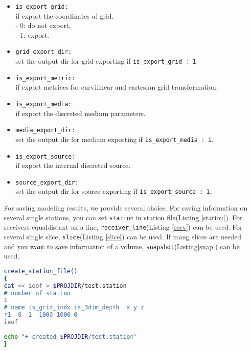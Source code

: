 \begin{itemize}
	\item \verb|is_export_grid:| \\
	if export the coordinates of grid.\\
	- 0: do not export, \\
	- 1: export.
	\item \verb|grid_export_dir:| \\
	set the output dir for grid exporting if \verb|is_export_grid : 1|.
	\item \verb|is_export_metric:| \\
	if export metrices for curvilinear and cartesian grid transformation.
	\item \verb|is_export_media:| \\
	if export the  discreted medium parameters. 
	\item \verb|media_export_dir:| \\
	set the output dir for medium exporting if \verb|is_export_media : 1|.
	\item \verb|is_export_source:| \\
	if export the internal discreted source.
	\item \verb|source_export_dir:| \\
	set the output dir for source exporting if \verb|is_export_source : 1|.
\end{itemize}
For saving modeling results, we provide several choice. For saving information on several single stations, you can set \verb|station| in station file(Listing \ref{station}). For receivers equaldistant on a line, \verb|receiver_line|(Listing \ref{recv}) can be used. For several single slice, \verb|slice|(Listing \ref{slice}) can be used. If mang slices are needed and you want to save information of a volume, \verb|snapshot|(Listing\ref{snap}) can be used.
\begin{lstlisting}[language=bash,
	caption=Example of setting stations,
	label={station},commentstyle=\color{codegreen},
	frame=tb]
create_station_file()
{
cat << ieof > $PROJDIR/test.station
# number of station
1
# name is_grid_indx is_3dim_depth  x y z
r1  0  1  1000 1000 0
ieof
	
echo "+ created $PROJDIR/test.station"
}
\end{lstlisting}
